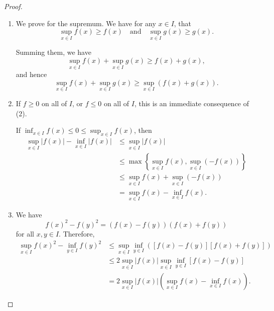 \documentclass[11pt]{article}
\numberwithin{equation}{section}
\theoremstyle{definition}
\theoremstyle{remark}
\newcommand{\pqty}[1]{\left(#1\right)}
\newcommand{\bqty}[1]{\left[#1\right]}
\newcommand{\Bqty}[1]{\left\{#1\right\}}
\newcommand{\abs}[1]{\left|#1\right|}
\newcommand{\qand}{\quad\text{and}\quad}
\begin{document}
\begin{proof}
\begin{enumerate}
        On the other hand, we have
        \begin{align*}
            &\phantom{\implies} \forall x \in I: \sup_{x \in I} \pqty{f\pqty{x}} \geq f\pqty{x} \\
            &\implies \forall x \in I: \lambda \sup_{x \in I} \pqty{f\pqty{x}} \geq \lambda f\pqty{x} \\
            &\implies \lambda \sup_{x \in I} \pqty{f\pqty{x}} \geq \sup_{x \in I} \pqty{\lambda f\pqty{x}}.
        \end{align*}

        \item We prove for the supremum. We have for any \(x \in I\), that
        \[
            \sup_{x \in I} f\pqty{x} \geq f\pqty{x}
            \qand
            \sup_{x \in I} g\pqty{x} \geq g\pqty{x}.
        \]

        Summing them, we have
        \[
            \sup_{x \in I} f\pqty{x} + \sup_{x \in I} g\pqty{x} \geq f\pqty{x} + g\pqty{x},
        \]
        and hence
        \[
             \sup_{x \in I} f\pqty{x} + \sup_{x \in I} g\pqty{x} \geq \sup_{x \in I} \pqty{f\pqty{x} + g\pqty{x}}.
        \]

        \item If \(f \geq 0\) on all of \(I\), or \(f \leq 0\) on all of \(I\), this is an immediate consequence of (2).
        
        If \(\inf_{x \in I} f\pqty{x} \leq 0 \leq \sup_{x \in I} f\pqty{x}\), then
        \begin{align*}
            \sup_{x \in I} \abs{f\pqty{x}} - \inf_{x \in I} \abs{f\pqty{x}} &\leq \sup_{x \in I} \abs{f \pqty{x}} \\
            &\leq \max \Bqty{\sup_{x \in I} f\pqty{x}, \sup_{x \in I} \pqty{-f\pqty{x}}} \\
            &\leq \sup_{x \in I} f\pqty{x} + \sup_{x \in I} \pqty{-f\pqty{x}} \\
            &= \sup_{x \in I} f\pqty{x} - \inf_{x \in I} f\pqty{x}.
        \end{align*}

        \item We have
        \[
            f\pqty{x}^2 - f\pqty{y}^2 = \pqty{f\pqty{x} - f\pqty{y}} \pqty{f\pqty{x} + f\pqty{y}}
        \]
        for all \(x, y \in I\). Therefore,
        \begin{align*}
            \sup_{x \in I} f\pqty{x}^2 - \inf_{y \in I} f\pqty{y}^2 &\leq \sup_{x \in I} \inf_{y \in I} \pqty{\bqty{f\pqty{x} - f\pqty{y}} \bqty{f\pqty{x} + f\pqty{y}}} \\
            &\leq 2 \sup_{x \in I} \abs{f\pqty{x}} \sup_{x \in I} \inf_{y \in I} \bqty{f\pqty{x} - f\pqty{y}} \\
            &= 2 \sup_{x \in I} \abs{f\pqty{x}} \pqty{\sup_{x \in I} f\pqty{x} - \inf_{x \in I} f\pqty{x}}.
        \end{align*}
    \end{enumerate}
\end{proof}
\end{document}
